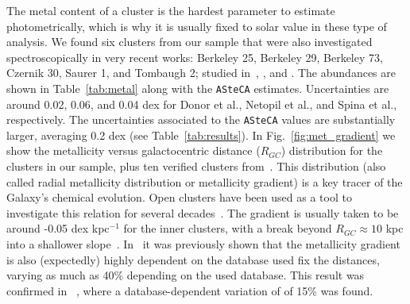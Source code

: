 \documentclass[draft]{aa}
\begin{document}
  The metal content of a cluster is the hardest parameter to estimate
  photometrically, which is why it is usually fixed to solar value in these
  type of analysis.
  We found six clusters from our sample that were also investigated
  spectroscopically in very recent works: Berkeley 25, Berkeley 29,
  Berkeley 73, Czernik 30, Saurer 1, and Tombaugh 2; studied
  in~\cite{Donor_2020}, \cite{Netopil_2022}, and \cite{Spina_2021}. The
  abundances are shown in Table~\ref{tab:metal} along with the \texttt{ASteCA}
  estimates. Uncertainties are around 0.02, 0.06, and 0.04 dex for Donor et
  al., Netopil et al., and Spina et al., respectively.
  The uncertainties associated to the \texttt{ASteCA} values are substantially
  larger, averaging 0.2 dex (see Table~\ref{tab:results}).
  In Fig.~\ref{fig:met_gradient} we show the metallicity versus
  galactocentric distance ($R_{GC}$) distribution for the clusters in our
  sample, plus ten verified clusters from~\cite{Perren_2020}.
  This distribution (also called radial metallicity distribution or
  metallicity gradient) is a key tracer of the Galaxy's chemical evolution.
  Open clusters have been used as a tool to investigate this relation for several
  decades~\citep{Janes_1979}. The gradient is usually taken to be around -0.05
  dex kpc$^{-1}$ for the inner clusters, with a break beyond $R_{GC}\approx10$
  kpc into a shallower slope~\citep{Donor_2020}. In~\cite{Donor_2018} it was
  previously shown that the metallicity gradient is also (expectedly) highly
  dependent on the database used fix the distances, varying as much as 40\%
  depending on the used database. This result was confirmed in~
  \cite{Donor_2020}, where a database-dependent variation of of 15\% was found.

\end{document}
